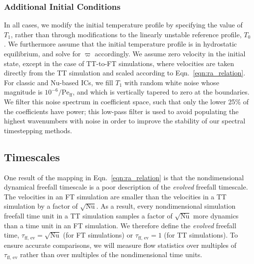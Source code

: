 \documentclass[aps, pre, onecolumn, nofootinbib, notitlepage, groupedaddress, amsfonts, amssymb, amsmath, longbibliography, superscriptaddress]{revtex4-1}
\newcommand{\Peff}{\ensuremath{\text{Pe}_{\text{ff}}}}
\begin{document}
\subsubsection{Additional Initial Conditions}
In all cases, we modify the initial temperature profile by specifying the value of $T_1$, rather than through modifications to the linearly unstable reference profile, $T_0$.
We furthermore assume that the initial temperature profile is in hydrostatic equilibrium, and solve for $\varpi$ accordingly.
We assume zero velocity in the initial state, except in the case of TT-to-FT simulations, where velocities are taken directly from the TT simulation and scaled according to Eqn.~\ref{eqn:ra_relation}.
For classic and Nu-based ICs,
we fill $T_1$ with random white noise whose magnitude is $10^{-6}/\Peff$, and which is vertically tapered to zero at the boundaries.
We filter this noise spectrum in coefficient space, such that only the lower 25\% of the coefficients have power; this low-pass filter is used to avoid populating the highest wavenumbers with noise in order to improve the stability of our spectral timestepping methods.


\subsection{Timescales}
\label{sec:timescales}
One result of the mapping in Eqn.~\ref{eqn:ra_relation} is that the nondimensional dynamical freefall timescale is a poor description of the \emph{evolved} freefall timescale.
The velocities in an FT simulation are smaller than the velocities in a TT simulation by a factor of $\sqrt{\text{Nu}}$.
As a result, every nondimensional simulation freefall time unit in a TT simulation samples a factor of $\sqrt{\text{Nu}}$ more dynamics than a time unit in an FT simulation.
We therefore define the \emph{evolved} freefall time, $\tau_{\text{ff, ev}} = \sqrt{\text{Nu}}$ (for FT simulations) or $\tau_{\text{ff, ev}} = 1$ (for TT simulations).
To ensure accurate comparisons, we will measure flow statistics over multiples of $\tau_{\text{ff, ev}}$ rather than over multiples of the nondimensional time units.
\end{document}
